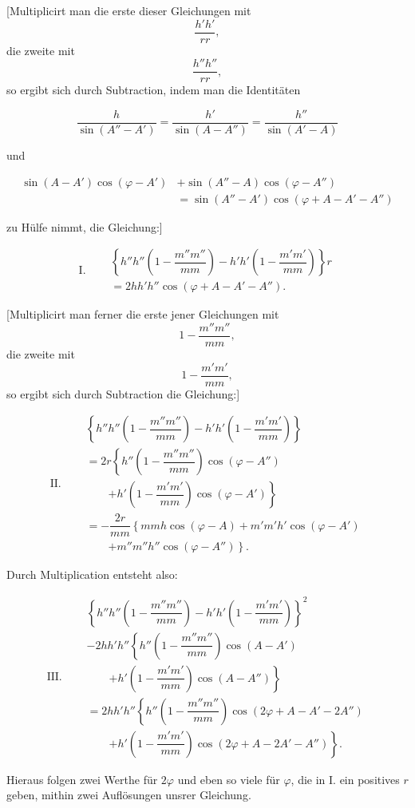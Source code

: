 
[Multiplicirt man die erste dieser Gleichungen mit
\[
\dfrac{h'h'}{rr},
\]
die zweite mit
\[
\dfrac{h''h''}{rr},
\]
so ergibt sich durch Subtraction, indem man die Identitäten

\[
\dfrac{h}{\sin(A''-A')} = \dfrac{h'}{\sin(A-A'')} = \dfrac{h''}{\sin(A'-A)}
\]

und

\[
\begin{aligned}\sin(A-A')\cos(\varphi-A') &+ \sin(A''-A)\cos(\varphi-A'')\\ &= \sin(A''-A')\cos(\varphi+A-A'-A'')\end{aligned}
\]

zu Hülfe nimmt, die Gleichung:]

\[
\mathrm{I.}\quad \begin{aligned}&\left\{h''h''\left(1-\dfrac{m''m''}{mm}\right) - h'h'\left(1-\dfrac{m'm'}{mm}\right)\right\}r \\
&= 2hh'h''\cos(\varphi+A-A'-A'').\end{aligned}
\]

[Multiplicirt man ferner die erste jener Gleichungen mit
\[
1 - \dfrac{m''m''}{mm},
\]
die zweite mit
\[
1 - \dfrac{m'm'}{mm},
\]
so ergibt sich durch Subtraction die Gleichung:]

\[
\mathrm{II.}\quad 
\begin{aligned}
&\left\{h''h''\left(1-\dfrac{m''m''}{mm}\right) - h'h'\left(1-\dfrac{m'm'}{mm}\right)\right\} \\
&= 2r\left\{h''\left(1-\dfrac{m''m''}{mm}\right)\cos(\varphi-A'')\right.\\ &\qquad\left. + h'\left(1-\dfrac{m'm'}{mm}\right)\cos(\varphi-A')\right\}\\
&= -\dfrac{2r}{mm}\left\{mmh\cos(\varphi-A) + m'm'h'\cos(\varphi-A')\right.\\ &\qquad\left. + m''m''h''\cos(\varphi-A'')\right\}.
\end{aligned}
\]

Durch Multiplication entsteht also:

\[
\mathrm{III.}\quad 
\begin{aligned}
&\left\{h''h''\left(1-\dfrac{m''m''}{mm}\right) - h'h'\left(1-\dfrac{m'm'}{mm}\right)\right\}^2 \\
&- 2hh'h''\left\{h''\left(1-\dfrac{m''m''}{mm}\right)\cos(A-A')\right.\\ &\qquad\left. + h'\left(1-\dfrac{m'm'}{mm}\right)\cos(A-A'')\right\}\\
&= 2hh'h''\left\{h''\left(1-\dfrac{m''m''}{mm}\right)\cos(2\varphi+A-A'-2A'')\right.\\ &\qquad\left. + h'\left(1-\dfrac{m'm'}{mm}\right)\cos(2\varphi+A-2A'-A'')\right\}.
\end{aligned}
\]

Hieraus folgen zwei Werthe für $2\varphi$ und eben so viele für $\varphi$, die in I. ein positives $r$ geben, mithin zwei Auflösungen unsrer Gleichung.
